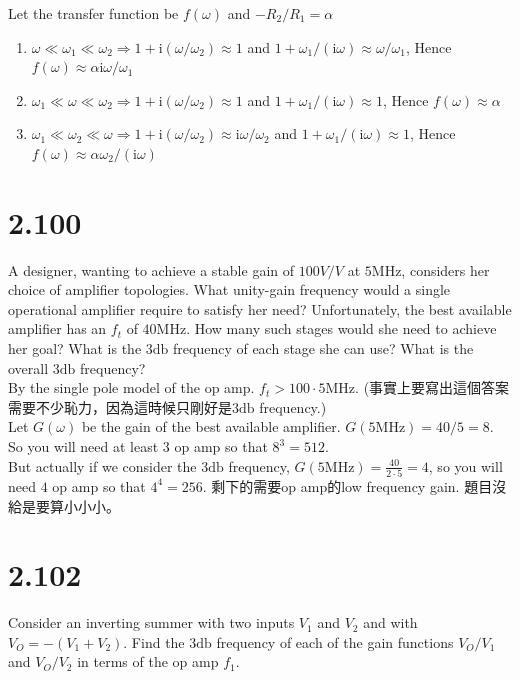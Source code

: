 \documentclass[12pt, a4paper]{article}
\newcommand{\sdb}{\si{\decibel}}
\newcommand{\img}{\mathrm{i}}
\begin{document}
Let the transfer function be $f(\omega)$ and $- R_2 / R_1 = \alpha$
\begin{enumerate}[label=(\alph*)]
  \item $\omega \ll \omega_1 \ll \omega_2 \Rightarrow 1 + \img(\omega / \omega_2) \approx 1$ and $1 + \omega_1/(\img \omega) \approx \omega / \omega_1$, Hence $f(\omega) \approx \alpha \img \omega / \omega_1$
  \item $\omega_1 \ll \omega \ll \omega_2 \Rightarrow 1 + \img(\omega / \omega_2) \approx 1$ and $1 + \omega_1/(\img \omega) \approx 1$, Hence $f(\omega) \approx \alpha$
  \item $\omega_1 \ll \omega_2 \ll \omega \Rightarrow 1 + \img(\omega / \omega_2) \approx \img \omega / \omega_2$ and $1 + \omega_1/(\img \omega) \approx 1$, Hence $f(\omega) \approx \alpha \omega_2 / (\img \omega)$
\end{enumerate}

\section{2.100}
A designer, wanting to achieve a stable gain of $100 \si{V/V}$ at $5 \si{\mega\hertz}$, considers her choice of amplifier topologies. What unity-gain frequency would a single operational amplifier require to satisfy her need? Unfortunately, the best available amplifier has an $f_t$ of $40 \si{\mega\hertz}$. How many such stages would she need to achieve her goal? What is the $3\sdb$ frequency of each stage she can use? What is the overall $3\sdb$ frequency? \\
By the single pole model of the op amp. $f_t > 100 \cdot 5 \si{\mega\hertz}$. (事實上要寫出這個答案需要不少恥力，因為這時候只剛好是$3 \sdb$ frequency.)\\
Let $G(\omega)$ be the gain of the best available amplifier. $G(5\si{\mega\hertz}) = 40 / 5 = 8$. So you will need at least $3$ op amp so that $8^3 = 512$.\\
But actually if we consider the $3\sdb$ frequency, $G(5 \si{\mega\hertz}) = \frac{40}{2 \cdot 5} = 4$, so you will need $4$ op amp so that $4^4 = 256$.
剩下的需要op amp的low frequency gain. 題目沒給是要算小小小。

\section{2.102}
Consider an inverting summer with two inputs $V_1$ and $V_2$ and with $V_O = -(V_1 + V_2)$. Find the $3 \sdb$ frequency of each of the gain functions $V_O / V_1$ and $V_O / V_2$ in terms of the op amp $f_1$.
\end{document}
